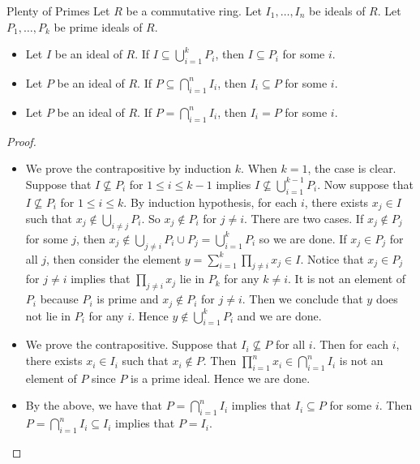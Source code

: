 \documentclass[a4paper]{article}
\begin{document}
\begin{prp}{Plenty of Primes}{} Let $R$ be a commutative ring. Let $I_1,\dots,I_n$ be ideals of $R$. Let $P_1,\dots,P_k$ be prime ideals of $R$. 
\begin{itemize}
\item Let $I$ be an ideal of $R$. If $I\subseteq\bigcup_{i=1}^kP_i$, then $I\subseteq P_i$ for some $i$. 
\item Let $P$ be an ideal of $R$. If $P\subseteq\bigcap_{i=1}^nI_i$, then $I_i\subseteq P$ for some $i$. 
\item Let $P$ be an ideal of $R$. If $P=\bigcap_{i=1}^nI_i$, then $I_i=P$ for some $i$. 
\end{itemize} \tcbline
\begin{proof}~\\
\begin{itemize}
\item We prove the contrapositive by induction $k$. When $k=1$, the case is clear. Suppose that $I\not\subseteq P_i$ for $1\leq i\leq k-1$ implies $I\not\subseteq\bigcup_{i=1}^{k-1}P_i$. Now suppose that $I\not\subseteq P_i$ for $1\leq i\leq k$. By induction hypothesis, for each $i$, there exists $x_j\in I$ such that $x_j\notin\bigcup_{i\neq j}P_i$. So $x_j\notin P_i$ for $j\neq i$. There are two cases. If $x_j\notin P_j$ for some $j$, then $x_j\notin\bigcup_{j\neq i}P_i\cup P_j=\bigcup_{i=1}^kP_i$ so we are done. If $x_j\in P_j$ for all $j$, then consider the element $y=\sum_{i=1}^k\prod_{j\neq i}x_j\in I$. Notice that $x_j\in P_j$ for $j\neq i$ implies that $\prod_{j\neq i}x_j$ lie in $P_k$ for any $k\neq i$. It is not an element of $P_i$ because $P_i$ is prime and $x_j\notin P_i$ for $j\neq i$. Then we conclude that $y$ does not lie in $P_i$ for any $i$. Hence $y\notin\bigcup_{i=1}^kP_i$ and we are done. 
\item We prove the contrapositive. Suppose that $I_i\not\subseteq P$ for all $i$. Then for each $i$, there exists $x_i\in I_i$ such that $x_i\notin P$. Then $\prod_{i=1}^nx_i\in\bigcap_{i=1}^nI_i$ is not an element of $P$ since $P$ is a prime ideal. Hence we are done. 
\item By the above, we have that $P=\bigcap_{i=1}^nI_i$ implies that $I_i\subseteq P$ for some $i$. Then $P=\bigcap_{i=1}^nI_i\subseteq I_i$ implies that $P=I_i$. 
\end{itemize}
\end{proof}
\end{prp}
\end{document}
